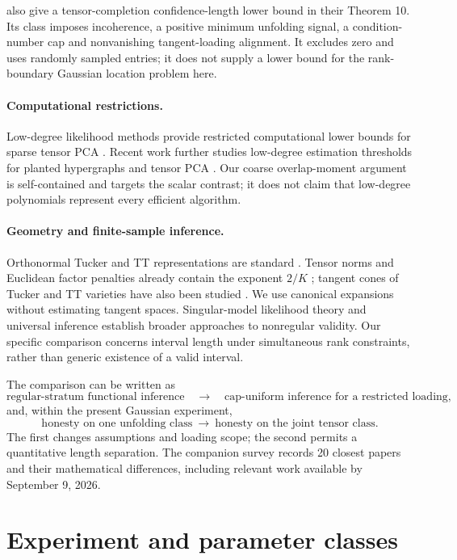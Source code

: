 \documentclass[11pt]{article}
\theoremstyle{remark}
\begin{document}
\citet{madu2026} also give a tensor-completion confidence-length lower bound in their Theorem 10. Its class imposes incoherence, a positive minimum unfolding signal, a condition-number cap and nonvanishing tangent-loading alignment. It excludes zero and uses randomly sampled entries; it does not supply a lower bound for the rank-boundary Gaussian location problem here.

\paragraph{Computational restrictions.}
Low-degree likelihood methods provide restricted computational lower bounds for sparse tensor PCA \citep{choo2021}. Recent work further studies low-degree estimation thresholds for planted hypergraphs and tensor PCA \citep{fu2026}. Our coarse overlap-moment argument is self-contained and targets the scalar contrast; it does not claim that low-degree polynomials represent every efficient algorithm.

\paragraph{Geometry and finite-sample inference.}
Orthonormal Tucker and TT representations are standard \citep{delathauwer2000,oseledets2011}. Tensor norms and Euclidean factor penalties already contain the exponent $2/K$ \citep{friedlandlim2018,fan2023}; tangent cones of Tucker and TT varieties have also been studied \citep{gao2025,kutschan2018}. We use canonical expansions without estimating tangent spaces. Singular-model likelihood theory \citep{drton2009} and universal inference \citep{wasserman2020} establish broader approaches to nonregular validity. Our specific comparison concerns interval length under simultaneous rank constraints, rather than generic existence of a valid interval.

The comparison can be written as
\[
 \text{regular-stratum functional inference}
 \quad\longrightarrow\quad
 \text{cap-uniform inference for a restricted loading},
\]
and, within the present Gaussian experiment,
\[
 \text{honesty on one unfolding class}
 \ \longrightarrow\
 \text{honesty on the joint tensor class}.
\]
The first changes assumptions and loading scope; the second permits a quantitative length separation. The companion survey records 20 closest papers and their mathematical differences, including relevant work available by September 9, 2026.

\section{Experiment and parameter classes}\label{sec:model}
\end{document}
